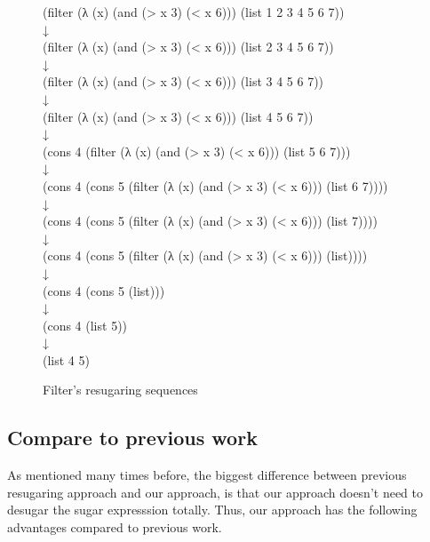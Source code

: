 \begin{figure}[ht]
	\centering
	\parbox[t]{\textwidth}{

				\begin{center}
				{
					\small\selectfont
					(filter (λ (x) (and (> x 3) (< x 6))) (list 1 2 3 4 5 6 7))\\
					↓\\
					(filter (λ (x) (and (> x 3) (< x 6))) (list 2 3 4 5 6 7))\\
					↓\\
					(filter (λ (x) (and (> x 3) (< x 6))) (list 3 4 5 6 7))\\
					↓\\
					(filter (λ (x) (and (> x 3) (< x 6))) (list 4 5 6 7))\\
					↓\\
					(cons 4 (filter (λ (x) (and (> x 3) (< x 6))) (list 5 6 7)))\\
					↓\\
					(cons 4 (cons 5 (filter (λ (x) (and (> x 3) (< x 6))) (list 6 7))))\\
					↓\\
					(cons 4 (cons 5 (filter (λ (x) (and (> x 3) (< x 6))) (list 7))))\\
					↓\\
					(cons 4 (cons 5 (filter (λ (x) (and (> x 3) (< x 6))) (list))))\\
					↓\\
					(cons 4 (cons 5 (list)))\\
					↓\\
					(cons 4 (list 5))\\
					↓\\
					(list 4 5)
				}

				\end{center}

			}
	\caption{Filter's resugaring sequences}
\label{fig:filter}
\end{figure}
\subsection{Compare to previous work}

As mentioned many times before, the biggest difference between previous resugaring approach and our approach, is that our approach doesn't need to desugar the sugar expresssion totally. Thus, our approach has the following advantages compared to previous work.

